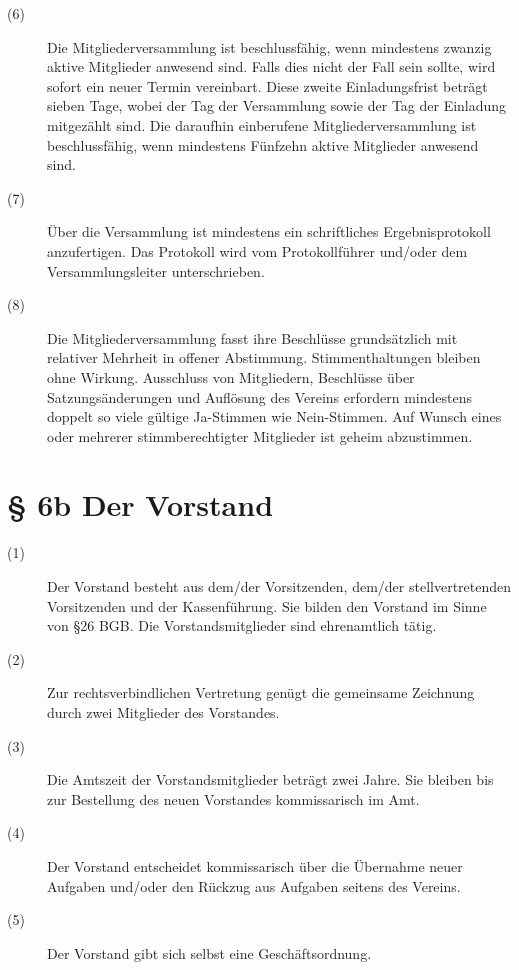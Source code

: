 \documentclass[a4paper,12pt]{scrartcl}
\begin{document}
\begin{description}
\item[(6)] Die Mitgliederversammlung ist beschlussfähig, wenn mindestens zwanzig aktive Mitglieder anwesend sind. Falls dies nicht der Fall sein sollte, wird sofort ein neuer Termin vereinbart. Diese zweite Einladungsfrist beträgt sieben Tage, wobei der Tag der Versammlung sowie der Tag der Einladung mitgezählt sind. Die daraufhin einberufene Mitgliederversammlung ist beschlussfähig, wenn mindestens Fünfzehn aktive Mitglieder anwesend sind.
\item[(7)] Über die Versammlung ist mindestens ein schriftliches Ergebnisprotokoll anzufertigen. Das Protokoll wird vom Protokollführer und/oder dem Versammlungsleiter unterschrieben.
\item[(8)] Die Mitgliederversammlung fasst ihre Beschlüsse grundsätzlich mit relativer Mehrheit in offener Abstimmung. Stimmenthaltungen bleiben ohne Wirkung. Ausschluss von Mitgliedern, Beschlüsse über Satzungsänderungen und Auflösung des Vereins erfordern mindestens doppelt so viele gültige Ja-Stimmen wie Nein-Stimmen. Auf Wunsch eines oder mehrerer stimmberechtigter Mitglieder ist geheim abzustimmen.

\end{description}



\section*{\S{} 6b Der Vorstand}
\begin{description} 

\item[(1)] Der Vorstand besteht aus dem/der Vorsitzenden, dem/der stellvertretenden Vorsitzenden und der Kassenführung. Sie bilden den Vorstand im Sinne von §26 BGB. Die Vorstandsmitglieder sind ehrenamtlich tätig.
\item[(2)] Zur rechtsverbindlichen Vertretung genügt die gemeinsame Zeichnung durch zwei Mitglieder des Vorstandes.
\item[(3)] Die Amtszeit der Vorstandsmitglieder beträgt zwei Jahre. Sie bleiben bis zur Bestellung des neuen Vorstandes kommissarisch im Amt.
\item[(4)] Der Vorstand entscheidet kommissarisch über die Übernahme neuer Aufgaben und/oder den Rückzug aus Aufgaben seitens des Vereins. %
\item[(5)] Der Vorstand gibt sich selbst eine Geschäftsordnung.

\end{description}
\end{document}
